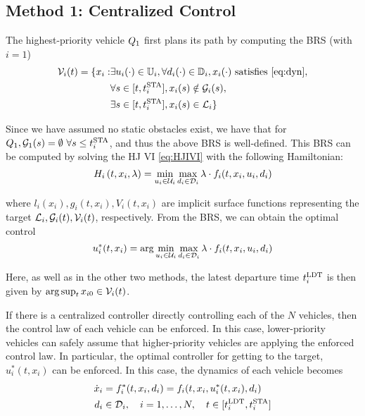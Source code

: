\subsection{Method 1: Centralized Control \label{sec:cc}}
The highest-priority vehicle $Q_1$ first plans its path by computing the BRS (with $i=1$)
\vspace{-0.3em}
\begin{equation}
\label{eq:BRS}
\begin{aligned}
\brs_i(t) = \{x_i: &\exists u_i(\cdot) \in \cfset_i, \forall d_i(\cdot) \in \dfset_i, x_i(\cdot) \text{ satisfies \eqref{eq:dyn}}, \\
&\forall s \in [t, \sta_i], x_i(s) \notin \obsset_i(s), \\
&\exists s \in [t, \sta_i], x_i(s) \in \targetset_i\}
\end{aligned}
\end{equation}

Since we have assumed no static obstacles exist, we have that for $Q_1, \mathcal{G}_1(s)=\emptyset ~ \forall s \le t^\text{STA}_i$, and thus the above BRS is well-defined. This BRS can be computed by solving the HJ VI \eqref{eq:HJIVI} with the following Hamiltonian:
\vspace{-0.3em}
\begin{equation}
H_i\left(t, x_i, \lambda\right) = \min_{u_i \in \mathcal{U}_i} \max_{d_i \in \mathcal{D}_i} \lambda \cdot f_i(t, x_i, u_i, d_i)
\end{equation}

\noindent where $l_i(x_i), g_i(t,x_i),V_i(t,x_i)$ are implicit surface functions representing the target $\mathcal{L}_i, \mathcal{G}_i(t), \mathcal{V}_i(t)$, respectively. From the BRS, we can obtain the optimal control
\vspace{-0.3em}
\begin{equation}
\label{eq:opt_ctrl_i}
u_i^*(t,x_i) =  \arg \min_{u_i \in \cset_i} \max_{d_i \in \dset_i} \lambda \cdot f_i(t, x_i, u_i, d_i)
\end{equation}

Here, as well as in the other two methods, the latest departure time $t^\text{LDT}_i$ is then given by $\arg \sup_t x_{i0} \in \mathcal{V}_i(t)$.

If there is a centralized controller directly controlling each of the $N$ vehicles, then the control law of each vehicle can be enforced. In this case, lower-priority vehicles can safely assume that higher-priority vehicles are applying the enforced control law. In particular, the optimal controller for getting to the target, $u^*_i(t, x_i)$ can be enforced. In this case, the dynamics of each vehicle becomes 
\vspace{-0.3em}
\begin{equation}
\label{eq:dyn_cc}
\begin{aligned}
\dot x_i &= f^*_i (t, x_i, d_i) = f_i(t, x_i, u^*_i(t,x_i), d_i) \\
d_i &\in \dset_i, \quad i = 1,\ldots, N, \quad t \in [\ldt_i, \sta_i]
\end{aligned}
\end{equation}

